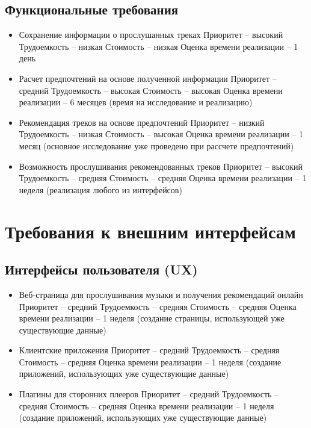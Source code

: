 \subsection{Функциональные требования}
\begin{itemize}
    \item Сохранение информации о прослушанных треках
    \subitem Приоритет -- высокий
    \subitem Трудоемкость -- низкая
    \subitem Стоимость -- низкая
    \subitem Оценка времени реализации -- 1 день
    \item Расчет предпочтений на основе полученной информации
    \subitem Приоритет -- средний
    \subitem Трудоемкость -- высокая
    \subitem Стоимость -- высокая
    \subitem Оценка времени реализации -- 6 месяцев (время на исследование и реализацию)
    \item Рекомендация треков на основе предпочтений
    \subitem Приоритет -- низкий
    \subitem Трудоемкость -- низкая
    \subitem Стоимость -- высокая
    \subitem Оценка времени реализации -- 1 месяц (основное исследование уже проведено при рассчете предпочтений)
    \item Возможность прослушивания рекомендованных треков
    \subitem Приоритет -- высокий
    \subitem Трудоемкость -- средняя
    \subitem Стоимость -- средняя
    \subitem Оценка времени реализации -- 1 неделя (реализация любого из интерфейсов)
\end{itemize}

\section{Требования к внешним интерфейсам}
\subsection{Интерфейсы пользователя (UX)}
\begin{itemize}
    \item Веб-страница для прослушивания музыки и получения рекомендаций онлайн
    \subitem Приоритет -- средний
    \subitem Трудоемкость -- средняя
    \subitem Стоимость -- средняя
    \subitem Оценка времени реализации -- 1 неделя (создание страницы, использующей уже существующие данные)
    \item Клиентские приложения
    \subitem Приоритет -- средний
    \subitem Трудоемкость -- средняя
    \subitem Стоимость -- средняя
    \subitem Оценка времени реализации -- 1 неделя (создание приложений, использующих уже существующие данные)
    \item Плагины для сторонних плееров
    \subitem Приоритет -- средний
    \subitem Трудоемкость -- средняя
    \subitem Стоимость -- средняя
    \subitem Оценка времени реализации -- 1 неделя (создание приложений, использующих уже существующие данные)
\end{itemize}

